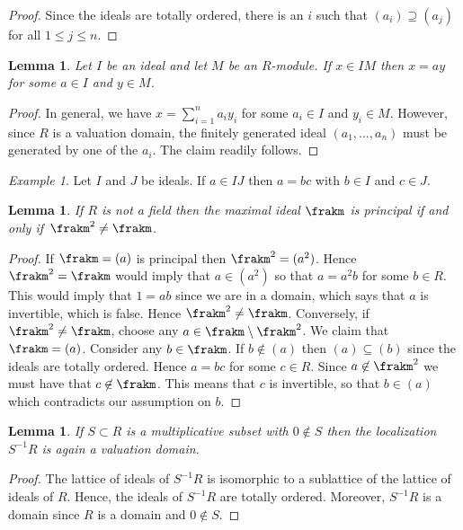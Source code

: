 \documentclass{amsart}
\numberwithin{equation}{section}%
\newtheorem{Lem}[equation]{Lemma}
\theoremstyle{remark}
\newtheorem{Exa}[equation]{Example}
\begin{document}
\begin{proof}
	Since the ideals are totally ordered, there is an $i$ such that $(a_i) \supseteq (a_j)$ for all $1\le j\le n$.
\end{proof}

\begin{Lem}\label{lem:ideal-module-product}
	Let $I$ be an ideal and let $M$ be an $R$-module. If $x \in IM$ then $x = ay$ for some $a\in I$ and $y \in M$.
\end{Lem}

\begin{proof}
	In general, we have $x = \sum_{i=1}^n a_i y_i$ for some $a_i \in I$ and $y_i \in M$. However, since $R$ is a valuation domain, the finitely generated ideal $(a_1,\ldots,a_n)$ must be generated by one of the $a_i$. The claim readily follows.
\end{proof}

\begin{Exa}
	Let $I$ and $J$ be ideals. If $a \in IJ$ then $a=bc$ with $b \in I$ and $c\in J$.
\end{Exa}

\begin{Lem}\label{lem:m-principal}
	If $R$ is not a field then the maximal ideal $\frakm$ is principal if and only if~$\frakm^2 \neq \frakm$.
\end{Lem}

\begin{proof}
	If $\frakm=(a)$ is principal then $\frakm^2=(a^2)$. Hence $\frakm^2=\frakm$ would imply that $a \in (a^2)$ so that $a=a^2 b$ for some $b \in R$. This would imply that $1=ab$ since we are in a domain, which says that $a$ is invertible, which is false. Hence $\frakm^2 \neq \frakm$. Conversely, if $\frakm^2 \neq \frakm$, choose any $a \in \frakm \setminus \frakm^2$. We claim that $\frakm = (a)$. Consider any $b \in \frakm$. If $b \not\in (a)$ then $(a) \subseteq (b)$ since the ideals are totally ordered. Hence $a=bc$ for some $c\in R$. Since $a \not\in \frakm^2$ we must have that $c \not\in \frakm$. This means that $c$ is invertible, so that $b \in (a)$ which contradicts our assumption on $b$.
\end{proof}

\begin{Lem}
	If $S \subset R$ is a multiplicative subset with $0 \not\in S$ then the localization $S^{-1} R$ is again a valuation domain.
\end{Lem}

\begin{proof}
	The lattice of ideals of $S^{-1} R$ is isomorphic to a sublattice of the lattice of ideals of $R$. Hence, the ideals of $S^{-1} R$ are totally ordered. Moreover, $S^{-1} R$ is a domain since $R$ is a domain and $0 \not\in S$.
\end{proof}
\end{document}
